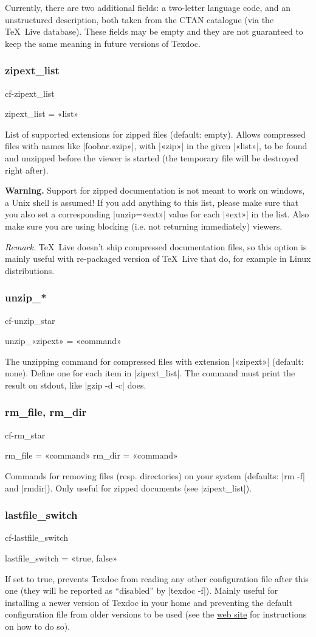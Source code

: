 \documentclass[a4paper, oneside]{scrartcl}
\newcommand\texlive{\TeX~Live\xspace}
\newif\ifframed
\newenvironment{cmdsubsub}[2]{%
  \framedfalse \commandes\subsubsection{#1}{#2}%
  }{%
  \endcommandes}
\begin{document}
Currently, there are two additional fields: a two-letter language code, and an
unstructured description, both taken from the CTAN catalogue (via the \texlive
database). These fields may be empty and they are not guaranteed to keep the
same meaning in future versions of Texdoc.

\begin{cmdsubsub}{zipext_list}{cf-zipext_list}
  zipext_list = «list»
\end{cmdsubsub}

List of supported extensions for zipped files (default: empty).  Allows
compressed files with names like |foobar.«zip»|, with |«zip»| in the given
|«list»|, to be found and unzipped before the viewer is started (the
temporary file will be destroyed right after).

\textbf{Warning.} Support for zipped documentation is not meant to work on
windows, a Unix shell is assumed! If you add anything to this list, please
make sure that you also set a corresponding |unzip=«ext»| value for each
|«ext»| in the list. Also make sure you are using blocking (i.e. not returning
immediately) viewers.

\textit{Remark.} \texlive doesn't ship compressed documentation files, so
this option is mainly useful with re-packaged version of \texlive that do,
for example in Linux distributions.

\begin{cmdsubsub}{unzip_*}{cf-unzip_star}
  unzip_«zipext» = «command»
\end{cmdsubsub}

The unzipping command for compressed files with extension |«zipext»| (default:
none). Define one for each item in |zipext_list|. The command must print
the result on stdout, like |gzip -d -c| does.

\begin{cmdsubsub}{rm_file, rm_dir}{cf-rm_star}
  rm_file = «command»
  rm_dir  = «command»
\end{cmdsubsub}

Commands for removing files (resp. directories) on your system (defaults:
|rm -f| and |rmdir|). Only useful for zipped documents (see |zipext_list|).

\begin{cmdsubsub}{lastfile_switch}{cf-lastfile_switch}
  lastfile_switch = «true, false»
\end{cmdsubsub}

If set to true, prevents Texdoc from reading any other configuration file
after this one (they will be reported as ``disabled'' by |texdoc -f|).  Mainly
useful for installing a newer version of Texdoc in your home and preventing
the default configuration file from older versions to be used (see the
\href{https://tug.org/texdoc/}{web site} for instructions on how to do so).
\end{document}
